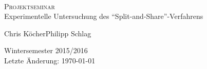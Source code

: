 \begin{titlepage}

\newcommand{\HRule}{\rule{\linewidth}{0.4pt}} %

\center %
 

\
\vspace{3.5cm}



\begin{framed}
 \vspace{0.4cm}
 \Huge \textsc{Projektseminar}\\[0.2cm]
 \normalsize Experimentelle Untersuchung des ``Split-and-Share''-Verfahrens
 \vspace{0.4cm}
\end{framed}



\begin{center}
 \large Chris Köcher\qquad\qquad Philipp Schlag\\[3cm]
\end{center}


{\large Wintersemester 2015/2016\\\small Letzte Änderung: \today}\\[3cm] %


\end{titlepage}
